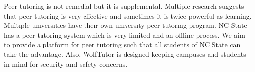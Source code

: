 \documentclass{sig-alternate-05-2015}
\begin{document}
Peer tutoring is not remedial but it is supplemental. Multiple research suggests that peer tutoring is very effective and sometimes it is twice powerful as learning. Multiple universities have their own university peer tutoring program. NC State has a peer tutoring system which is very limited and an offline process. We aim to provide a platform for peer tutoring such that all students of NC State can take the advantage. Also, WolfTutor is designed keeping campuses and students in mind for security and safety concerns.
%

\end{document}
